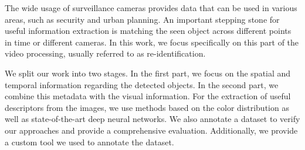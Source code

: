\documentclass[12pt]{report}
\begin{document}

The wide usage of surveillance cameras provides data that can be used in various areas, such as security and urban planning. An important stepping stone for useful information extraction is matching the seen object across different points in time or different cameras. In this work, we focus specifically on this part of the video processing, usually referred to as re-identification.

We split our work into two stages. In the first part, we focus on the spatial and temporal information regarding the detected objects. In the second part, we combine this metadata with the visual information. For the extraction of useful descriptors from the images, we use methods based on the color distribution as well as state-of-the-art deep neural networks. We also annotate a dataset to verify our approaches and provide a comprehensive evaluation. Additionally, we provide a custom tool we used to annotate the dataset.
\end{document}
